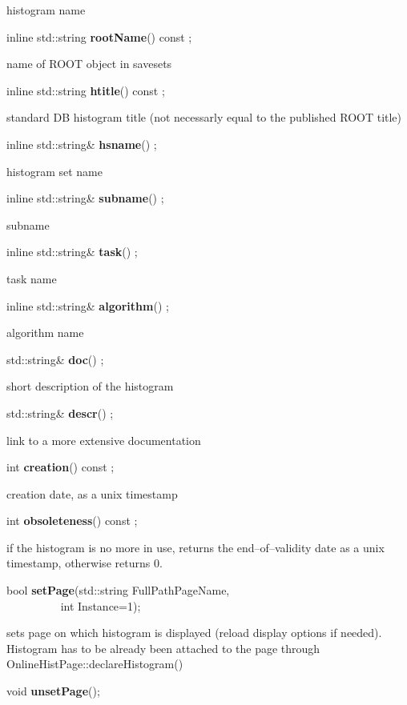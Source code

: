  histogram name


\item    inline std::string {\bf rootName}() const ;

 name of ROOT object in savesets


\item    inline std::string {\bf htitle}() const ;

 standard DB histogram title (not necessarly equal to the published ROOT title)


\item    inline std::string\& {\bf hsname}() ;

 histogram set name


\item    inline std::string\& {\bf subname}() ;

 subname


\item    inline std::string\& {\bf task}() ;

 task name


\item    inline std::string\& {\bf algorithm}() ;

 algorithm name


\item    std::string\& {\bf doc}() ;

 short description of the histogram


\item    std::string\& {\bf descr}() ;

 link to a more extensive documentation


\item    int {\bf creation}() const ;

 creation date, as a unix timestamp


\item    int {\bf obsoleteness}() const ;

 if the histogram is no more in use, returns the end--of--validity date
 as a unix timestamp, otherwise returns 0.


\item    bool {\bf setPage}(std::string FullPathPageName,\\\mbox{}~~~~~~~~~
	       int Instance=1);

 sets page on which histogram is displayed (reload display options if needed). Histogram has to be already
 been attached to the page through OnlineHistPage::declareHistogram()


\item    void {\bf unsetPage}();


